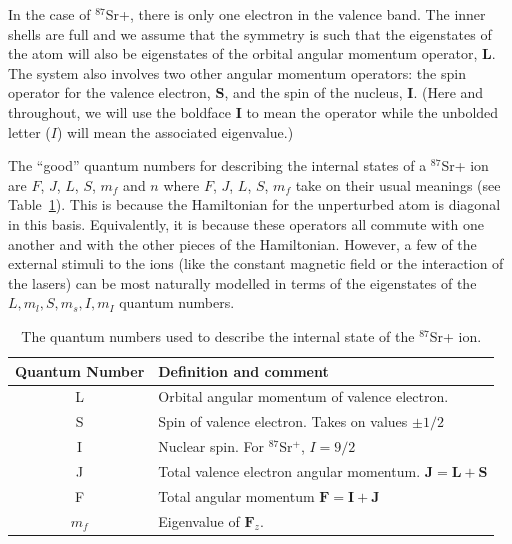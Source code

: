 In the case of $^{87}$Sr+, there is only one electron in the valence band. The inner shells are full and we assume that the symmetry is such that the eigenstates of the atom will also be eigenstates of the orbital angular momentum operator, $\mathbf{L}$.
 The system also involves two other angular momentum operators: the spin operator for the valence electron, $\mathbf{S}$, %
 and the spin of the nucleus, $\mathbf{I}$. 
(Here and throughout, we will use the boldface $\mathbf{I}$ to mean the operator while the unbolded letter ($I$) will mean the associated eigenvalue.)

The ``good'' quantum numbers for describing the internal states of a $^{87}$Sr+ ion are $F$, $J$, $L$, $S$, $m_f$ and $n$\cite{experimental_hyperfine_alkali_arimondo}\cite{cuaMITnotes} where $F$, $J$, $L$, $S$, $m_f$ take on their usual meanings (see Table\, \ref{quantumNumberQuickref}). This is because the Hamiltonian for the unperturbed atom is diagonal in this basis. Equivalently,  it is because these operators all commute with one another and with the other pieces of the Hamiltonian. However,  a few of the external stimuli to the ions (like the constant magnetic field or the interaction of the lasers) can be most naturally modelled in terms of the eigenstates of the $L, m_l, S, m_s, I, m_I$ quantum numbers.   

\begin{table}[h!]
\centering
\begin{tabular}{|c|l|}
\hline
Quantum Number & Definition and comment \\ \hline \hline
L & Orbital angular momentum of valence electron. \\ \hline
S & Spin of valence electron. Takes on values $\pm 1/2$ \\ \hline
I & Nuclear spin. For $^{87}$Sr$^+$, $I=9/2$ \\ \hline
J & Total valence electron angular momentum. $\mathbf{J}=\mathbf{L}+\mathbf{S}$ \\ \hline
F & Total angular momentum $\mathbf{F}=\mathbf{I}+\mathbf{J}$ \\ \hline
$m_f$ & Eigenvalue of $\mathbf{F}_z$.\\ \hline
\end{tabular}
\caption{The quantum numbers used to describe the internal state of the $^{87}$Sr+ ion.}
\label{quantumNumberQuickref}
\end{table}


